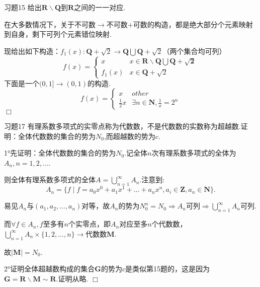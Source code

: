 \documentclass[11pt, a4paper, twoside]{ctexbook}
\newenvironment{proof2}{{\noindent\heiti 证明}}{\hfill $\Box $\par}
\newenvironment{proof3}{{\noindent\heiti 解}}{\hfill $\Box $\par}
\begin{document}
	\begin{myproposition}{习题15}{}
		给出$\mathbf{R\backslash Q}$到$\mathbf{R}$之间的一一对应.
    \end{myproposition}
	\begin{proof3}
		在大多数情况下，关于不可数$\to$不可数$+$可数的构造，都是绝大部分个元素映射到自身，剩下可列个元素错位映射.


		现给出如下构造：$f_{1}(x):\mathbf{Q}+\sqrt{2} \to  \mathbf{Q}\bigcup \mathbf{Q}+\sqrt{2}$（两个集合均可列）
		$$f(x)=\left\{\begin{matrix}
			x \qquad & x\in \mathbf{R\backslash Q\bigcup \mathbf{Q}+\sqrt{2}}\\
			f_{1}(x) & x\in \mathbf{Q}+\sqrt{2}
		   
		   \end{matrix}\right.$$
		下面是一个$(0,1]\to (0,1)$的构造.
		$$f(x)=\left\{\begin{matrix}
			x&other\\\displaystyle\frac{1}{2}x & \exists n \in \mathbf{N},\displaystyle\frac{1}{x}=2^{n}
		\end{matrix}\right.$$    
	\end{proof3}


	\begin{myproposition}{习题17}{}
		有理系数多项式的实零点称为代数数，不是代数数的实数称为超越数.证明：全体代数数的集合的势为$N_{0}$,而超越数的势为$c$.
    \end{myproposition}
	\begin{proof2}
		1°先证明：全体代数数的集合的势为$N_{0}$.记全体$n$次有理系数多项式的全体为$A_{n},n=1,2,…$.


		则全体有理系数多项式的全体$A=\displaystyle\bigcup_{n=1}^{\infty}A_{n}.$注意到:$$A_{n}=\{f\mid f=a_{0}x^{0}+a_{1}x^{1}+…+a_{n}x^{n},a_{i}\in\mathbf{Z},a_{n}\in \mathbf{N}\}.$$
		
		
		易见$A_{n}$与$(a_{1},a_{2},…,a_{n})$对等，故$A_{n}$的势为$N_{0}^{n}=N_{0} \Rightarrow A_{n}$可列$\Rightarrow \displaystyle\bigcup_{n=1}^{\infty}A_{n}$可列.
		
		
		而$\forall f \in  A_{n},f$至多有$n$个实零点，即$A_{n}$对应至多$n$个代数数，$\displaystyle\bigcup_{n=1}^{\infty}A_{n}\times \{1,2,…,n\}\to $代数数$\mathbf{M}$.
		
		
		故$\mid \mathbf{M}\mid =N_{0}$.
		
		
		2°证明全体超越数构成的集合$\mathbf{G}$的势为$c$是类似第15题的，这是因为$\mathbf{G}=\mathbf{R}\backslash\mathbf{M}\sim\mathbf{R}$.证明从略.
	\end{proof2}
\end{document}
